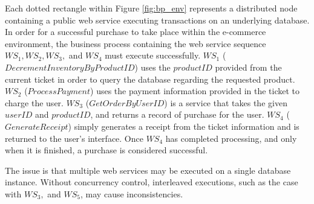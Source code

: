 Each dotted rectangle within Figure \ref{fig:bp_env} represents a distributed node containing a public web service executing transactions on an underlying database. In order for a successful purchase to take place within the e-commerce environment, the business process containing the web service sequence $WS_{1}, WS_{2}, WS_{3},$ and $WS_{4}$ must execute successfully. $WS_{1}$ ($DecrementInventoryByProductID$) uses the $productID$ provided from the current ticket in order to query the database regarding the requested product. $WS_{2}$ ($ProcessPayment$) uses the payment information provided in the ticket to charge the user. $WS_{3}$ ($GetOrderByUserID$) is a service that takes the given $userID$ and $product ID$, and returns a record of purchase for the user. $WS_{4}$ ($GenerateReceipt$) simply generates a receipt from the ticket information and is returned to the user's interface. Once $WS_{4}$ has completed processing, and only when it is finished, a purchase is considered successful.

The issue is that multiple web services may be executed on a single database instance. Without concurrency control, interleaved executions, such as the case with $WS_{3},$ and $WS_{5}$, may cause inconsistencies. 


